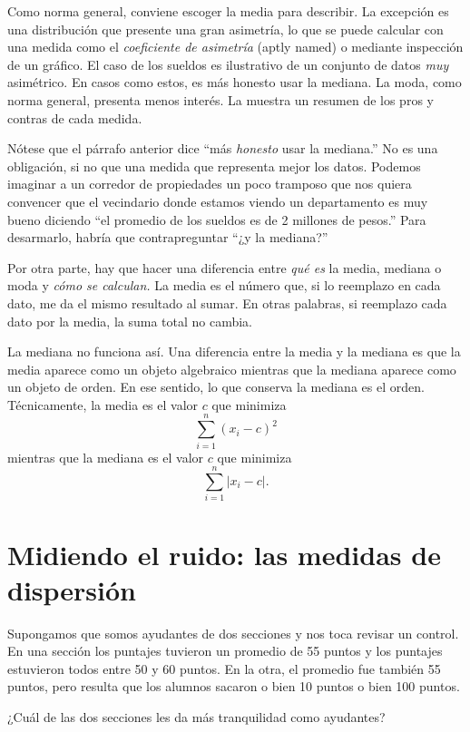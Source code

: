 Como norma general, conviene escoger la media para describir. La excepción es una distribución que presente una gran asimetría, lo que se puede calcular con una medida como el \emph{coeficiente de asimetría} (aptly named) o mediante inspección de un gráfico. El caso de los sueldos es ilustrativo de un conjunto de datos \emph{muy} asimétrico. En casos como estos, es más honesto usar la mediana. La moda, como norma general, presenta menos interés. La   muestra un resumen de los pros y contras de cada medida.

\informal

Nótese que el párrafo anterior dice \enquote{más \emph{honesto} usar la mediana.} No es una obligación, si no que una medida que representa mejor los datos. Podemos imaginar a un corredor de propiedades un poco tramposo que nos quiera convencer que el vecindario donde estamos viendo un departamento es muy bueno diciendo \enquote{el promedio de los sueldos es de 2 millones de pesos.} Para desarmarlo, habría que contrapreguntar \enquote{¿y la mediana?}

Por otra parte, hay que hacer una diferencia entre \emph{qué es} la media, mediana o moda y \emph{cómo se calculan.} La media es el número que, si lo reemplazo en cada dato, me da el mismo resultado al sumar. En otras palabras, si reemplazo cada dato por la media, la suma total no cambia.

La mediana no funciona así. Una diferencia entre la media y la mediana es que la media aparece como un objeto algebraico mientras que la mediana aparece como un objeto de orden. En ese sentido, lo que conserva la mediana es el orden. Técnicamente, la media es el valor \(c\)  que minimiza \[\sum_{i=1}^n \left(x_i-c\right)^2\] mientras que la mediana es el valor \(c\) que minimiza \[\sum_{i=1}^n |x_i-c|.\]

\section{Midiendo el ruido: las medidas de dispersión}


Supongamos que somos ayudantes de dos secciones y nos toca revisar un control. En una sección los puntajes tuvieron un promedio de 55 puntos y los puntajes estuvieron todos entre 50 y 60 puntos. En la otra, el promedio fue también 55 puntos, pero resulta que los alumnos sacaron o bien 10 puntos o bien 100 puntos.

\begin{pausa}
¿Cuál de las dos secciones les da más tranquilidad como ayudantes?
\end{pausa}

